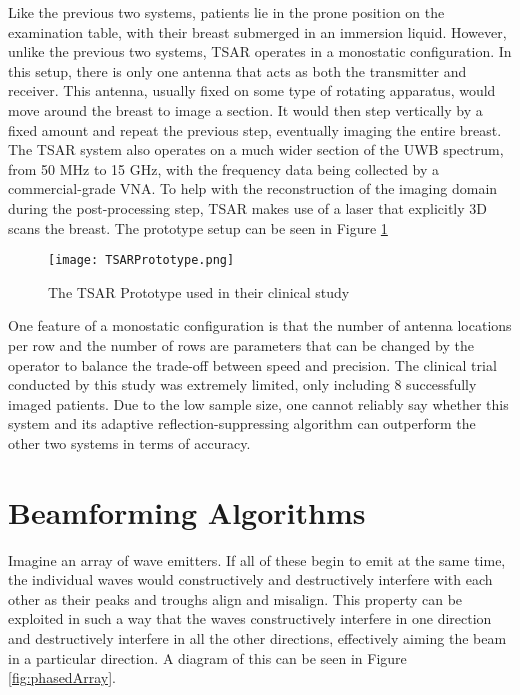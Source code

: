 Like the previous two systems, patients lie in the prone position on the examination table, with their breast submerged
in an immersion liquid. However, unlike the previous two systems, TSAR operates in a monostatic configuration. In this
setup, there is only one antenna that acts as both the transmitter and receiver. This antenna, usually fixed on some
type of rotating apparatus, would move around the breast to image a section. It would then step vertically by a fixed
amount and repeat the previous step, eventually imaging the entire breast. The TSAR system also operates on a much wider
section of the UWB spectrum, from 50 MHz to 15 GHz, with the frequency data being collected by a commercial-grade VNA.
To help with the reconstruction of the imaging domain during the post-processing step, TSAR makes use of a laser that
explicitly 3D scans the breast. The prototype setup can be seen in Figure \ref{fig:TSARPrototype} \hfill \break
\begin{figure}
    \texttt{[image: TSARPrototype.png]}
    \centering
    \caption{The TSAR Prototype used in their clinical study \cite{bourquiPrototypeSystemMeasuring2012}}
    \label{fig:TSARPrototype}
\end{figure}
One feature of a monostatic configuration is that the number of antenna locations per row and the number of rows are
parameters that can be changed by the operator to balance the trade-off between speed and precision. The clinical trial
conducted by this study was extremely limited, only including 8 successfully imaged patients. Due to the low sample
size, one cannot reliably say whether this system and its adaptive reflection-suppressing algorithm can outperform the
other two systems in terms of accuracy. \hfill 

\section{Beamforming Algorithms}
\label{BeamformingAlgorithms}
Imagine an array of wave emitters. If all of these begin to emit at the same time, the individual waves would
constructively and destructively interfere with each other as their peaks and troughs align and misalign. This property
can be exploited in such a way that the waves constructively interfere in one direction and destructively interfere in
all the other directions, effectively aiming the beam in a particular direction. A diagram of this can be seen in Figure
\ref{fig:phasedArray}.

